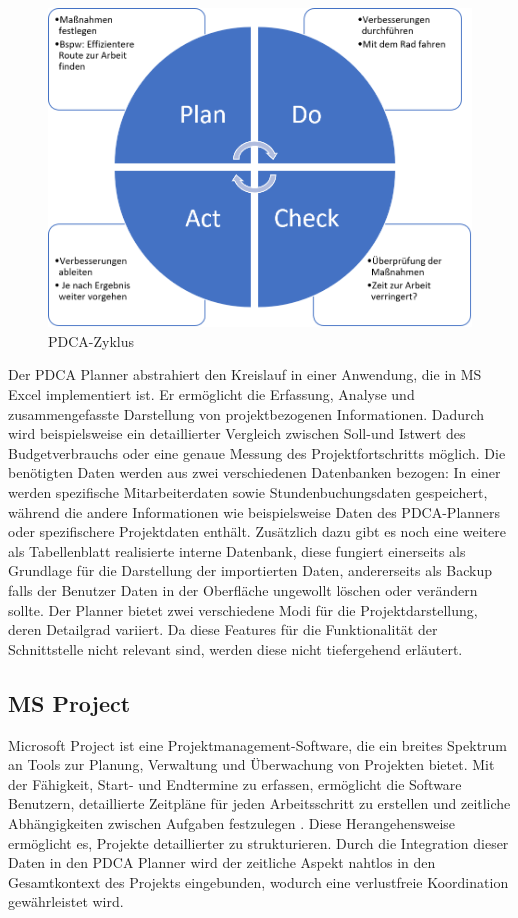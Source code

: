 \documentclass[11pt,a4paper]{report}
\begin{document}
\begin{figure}[h]
    \centering
    \includegraphics[width= \textwidth]{images/PDCA_Zyklus.png}
    \caption{PDCA-Zyklus}
    \label{fig:PDCA-Zyklus}
\end{figure}

\noindent
Der PDCA Planner abstrahiert den Kreislauf in einer Anwendung, die in MS Excel implementiert ist. Er ermöglicht die Erfassung, Analyse und zusammengefasste Darstellung von projektbezogenen Informationen. Dadurch wird beispielsweise ein detaillierter Vergleich zwischen Soll-und Istwert des Budgetverbrauchs oder eine genaue Messung des Projektfortschritts möglich. Die benötigten Daten werden aus zwei verschiedenen Datenbanken bezogen: In einer werden spezifische Mitarbeiterdaten sowie Stundenbuchungsdaten gespeichert, während die andere Informationen wie beispielsweise Daten des PDCA-Planners oder spezifischere Projektdaten enthält. Zusätzlich dazu gibt es noch eine weitere als Tabellenblatt realisierte interne Datenbank, diese fungiert einerseits als Grundlage für die Darstellung der importierten Daten, andererseits als Backup falls der Benutzer Daten in der Oberfläche ungewollt löschen oder verändern sollte. Der Planner bietet zwei verschiedene Modi für die Projektdarstellung, deren Detailgrad variiert. Da diese Features für die Funktionalität der Schnittstelle nicht relevant sind, werden diese nicht tiefergehend erläutert.

\subsection{MS Project}
Microsoft Project ist eine Projektmanagement-Software, die ein breites Spektrum an Tools zur Planung, Verwaltung und Überwachung von Projekten bietet. Mit der Fähigkeit, Start- und Endtermine zu erfassen, ermöglicht die Software Benutzern, detaillierte Zeitpläne für jeden Arbeitsschritt zu erstellen und zeitliche Abhängigkeiten zwischen Aufgaben festzulegen \cite{MSProject}. Diese Herangehensweise ermöglicht es, Projekte detaillierter zu strukturieren. Durch die Integration dieser Daten in den PDCA Planner wird der zeitliche Aspekt nahtlos in den Gesamtkontext des Projekts eingebunden, wodurch eine verlustfreie Koordination gewährleistet wird.
\end{document}
